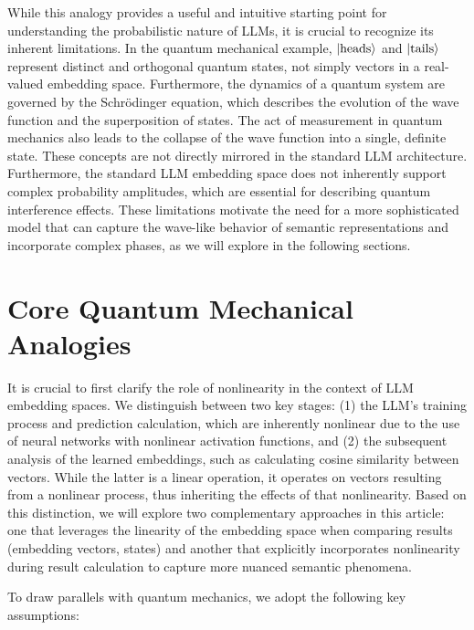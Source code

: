 \documentclass[prd,amsmath,amssymb,12pt]{revtex4}
\DeclarePairedDelimiter\ket{\lvert}{\rangle}
\begin{document}
\noindent
While this analogy provides a useful and intuitive starting point for understanding the probabilistic
nature of LLMs, it is crucial to recognize its inherent limitations. In the quantum mechanical example,
$\ket{\text{heads}}$ and $\ket{\text{tails}}$ represent distinct and orthogonal quantum states, not
simply vectors in a real-valued embedding space. Furthermore, the dynamics of a quantum system are
governed by the Schrödinger equation, which describes the evolution of the wave function and the
superposition of states. The act of measurement in quantum mechanics also leads to the collapse of
the wave function into a single, definite state. These concepts are not directly mirrored in the
standard LLM architecture. Furthermore, the standard LLM embedding space does not inherently
support complex probability amplitudes, which are essential for describing quantum interference
effects. These limitations motivate the need for a more sophisticated model that can capture the
wave-like behavior of semantic representations and incorporate complex phases, as we will explore
in the following sections.


\section{Core Quantum Mechanical Analogies}

It is crucial to first clarify the role of nonlinearity in the context of LLM embedding spaces. We distinguish between
two key stages: (1) the LLM's training process and prediction calculation, which are inherently nonlinear due to the
use of neural networks with nonlinear activation functions, and (2) the subsequent analysis of the learned embeddings,
such as calculating cosine similarity between vectors. While the latter is a linear operation, it operates on vectors
resulting from a nonlinear process, thus inheriting the effects of that nonlinearity.
Based on this distinction, we will explore two complementary approaches in this article: one that leverages the linearity
of the embedding space when comparing results (embedding vectors, states) and another that explicitly incorporates
nonlinearity during result calculation to capture more nuanced semantic phenomena.

To draw parallels with quantum mechanics, we adopt the following key assumptions:
\end{document}
